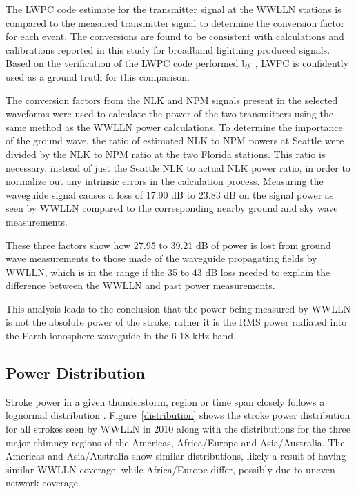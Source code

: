 \documentclass[12pt]{article}
\begin{document}
The LWPC code estimate for the transmitter signal at the WWLLN stations is compared to the measured transmitter signal to determine the conversion factor for each event. The conversions are found to be consistent with calculations and calibrations reported in this study for broadband lightning produced signals. Based on the verification of the LWPC code performed by \citet{Thomson2010}, LWPC is confidently used as a ground truth for this comparison.

The conversion factors from the NLK and NPM signals present in the selected waveforms were used to calculate the power of the two transmitters using the same method as the WWLLN power calculations. To determine the importance of the ground wave, the ratio of estimated NLK to NPM powers at Seattle were divided by the NLK to NPM ratio at the two Florida stations. This ratio is necessary, instead of just the Seattle NLK to actual NLK power ratio, in order to normalize out any intrinsic errors in the calculation process. Measuring the waveguide signal causes a loss of 17.90 dB to 23.83 dB on the signal power as seen by WWLLN compared to the corresponding nearby ground and sky wave measurements.

These three factors show how 27.95 to 39.21 dB of power is lost from ground wave measurements to those made of the waveguide propagating fields by WWLLN, which is in the range if the 35 to 43 dB loss needed to explain the difference between the WWLLN and past power measurements.

This analysis leads to the conclusion that the power being measured by WWLLN is not the absolute power of the stroke, rather it is the RMS power radiated into the Earth-ionosphere waveguide in the 6-18 kHz band.

\subsection{Power Distribution}

Stroke power in a given thunderstorm, region or time span closely follows a lognormal distribution \citep{Golde1977}. Figure~\ref{distribution} shows the stroke power distribution for all strokes seen by WWLLN in 2010 along with the distributions for the three major chimney regions of the Americas, Africa/Europe and Asia/Australia. The Americas and Asia/Australia show similar distributions, likely a result of having similar WWLLN coverage, while Africa/Europe differ, possibly due to uneven network coverage.
\end{document}
